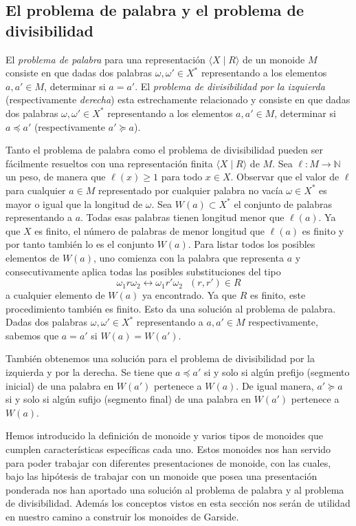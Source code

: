 \documentclass[12pt]{book}
\theoremstyle{definition}
\begin{document}
\subsection{El problema de palabra y el problema de divisibilidad}
\label{sec:pro_palabra}
El \textit{problema de palabra} para una representación $\langle X\mid R\rangle$ de un monoide $M$ consiste en que dadas dos palabras $\omega,\omega'\in X^*$ representando a los elementos $a,a'\in M$, determinar si $a=a'$. El \textit{problema de divisibilidad por la izquierda} (respectivamente \textit{derecha}) esta estrechamente relacionado y consiste en que dadas
dos palabras $\omega,\omega'\in X^*$ representando a los elementos $a,a'\in M$, determinar si $a\preceq a'$ (respectivamente $a'\succeq a$).

Tanto el problema de palabra como el problema de divisibilidad pueden ser fácilmente resueltos con una representación finita $\langle X\mid R\rangle$ de $M$. Sea $\ell:M\rightarrow\mathbb{N}$ un peso, de manera que $\ell(x)\geq 1$ para todo $x\in X$. Observar que el valor de $\ell$ para cualquier $a\in M$ representado por cualquier palabra no vacía $\omega\in X^*$ es mayor o igual que la longitud de $\omega$. Sea $W(a)\subset X^*$ el conjunto de palabras representando a $a$. Todas esas palabras tienen longitud menor que $\ell(a)$. Ya que $X$ es finito, el número de palabras de menor longitud que $\ell(a)$ es finito y por tanto también lo es el conjunto $W(a)$. Para listar todos los posibles elementos de $W(a)$, uno comienza con la palabra que representa $a$ y consecutivamente aplica todas las posibles substituciones del tipo
$$\omega_1 r\omega_2\leftrightarrow \omega_1 r'\omega_2\ \ \ (r,r')\in R$$
a cualquier elemento de $W(a)$ ya encontrado. Ya que $R$ es finito, este procedimiento también es finito. Esto da una solución al problema de palabra. Dadas dos palabras $\omega,\omega'\in X^*$ representando a $a,a'\in M$ respectivamente, sabemos que $a=a'$ si $W(a)=W(a')$.

También obtenemos una solución para el problema de divisibilidad por la izquierda y por la derecha. Se tiene que $a\preceq a'$ si y solo si algún prefijo (segmento inicial) de una palabra en $W(a')$ pertenece a $W(a)$. De igual manera, $a'\succeq a$ si y solo si algún sufijo (segmento final) de una palabra en $W(a')$ pertenece a $W(a)$.

Hemos introducido la definición de monoide y varios tipos de monoides que cumplen características específicas cada uno. Estos monoides nos han servido para poder trabajar con diferentes presentaciones de monoide, con las cuales, bajo las hipótesis de trabajar con un monoide que posea una presentación ponderada nos han aportado una solución al problema de palabra y al problema de divisibilidad. Además los conceptos vistos en esta sección nos serán de utilidad en nuestro camino a construir los monoides de Garside.
\end{document}
